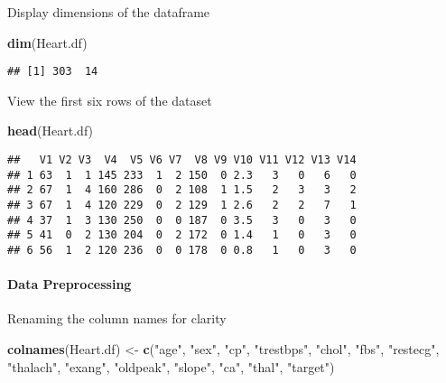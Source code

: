 \documentclass[
]{article}
\newenvironment{Shaded}{\begin{snugshade}}{\end{snugshade}}
\newcommand{\FunctionTok}[1]{\textcolor[rgb]{0.13,0.29,0.53}{\textbf{#1}}}
\newcommand{\NormalTok}[1]{#1}
\newcommand{\OtherTok}[1]{\textcolor[rgb]{0.56,0.35,0.01}{#1}}
\newcommand{\StringTok}[1]{\textcolor[rgb]{0.31,0.60,0.02}{#1}}
\begin{document}
Display dimensions of the dataframe

\begin{Shaded}
\begin{Highlighting}[]
\FunctionTok{dim}\NormalTok{(Heart.df)}
\end{Highlighting}
\end{Shaded}

\begin{verbatim}
## [1] 303  14
\end{verbatim}

View the first six rows of the dataset

\begin{Shaded}
\begin{Highlighting}[]
\FunctionTok{head}\NormalTok{(Heart.df)}
\end{Highlighting}
\end{Shaded}

\begin{verbatim}
##   V1 V2 V3  V4  V5 V6 V7  V8 V9 V10 V11 V12 V13 V14
## 1 63  1  1 145 233  1  2 150  0 2.3   3   0   6   0
## 2 67  1  4 160 286  0  2 108  1 1.5   2   3   3   2
## 3 67  1  4 120 229  0  2 129  1 2.6   2   2   7   1
## 4 37  1  3 130 250  0  0 187  0 3.5   3   0   3   0
## 5 41  0  2 130 204  0  2 172  0 1.4   1   0   3   0
## 6 56  1  2 120 236  0  0 178  0 0.8   1   0   3   0
\end{verbatim}

\paragraph{\texorpdfstring{\textbf{Data
Preprocessing}}{Data Preprocessing}}\label{data-preprocessing}

Renaming the column names for clarity

\begin{Shaded}
\begin{Highlighting}[]
\FunctionTok{colnames}\NormalTok{(Heart.df) }\OtherTok{\textless{}{-}} \FunctionTok{c}\NormalTok{(}\StringTok{"age"}\NormalTok{, }\StringTok{"sex"}\NormalTok{, }\StringTok{"cp"}\NormalTok{, }\StringTok{"trestbps"}\NormalTok{, }\StringTok{"chol"}\NormalTok{, }\StringTok{"fbs"}\NormalTok{, }\StringTok{"restecg"}\NormalTok{, }\StringTok{"thalach"}\NormalTok{, }\StringTok{"exang"}\NormalTok{, }\StringTok{"oldpeak"}\NormalTok{, }\StringTok{"slope"}\NormalTok{, }\StringTok{"ca"}\NormalTok{, }\StringTok{"thal"}\NormalTok{, }\StringTok{"target"}\NormalTok{)}
\end{Highlighting}
\end{Shaded}
\end{document}
